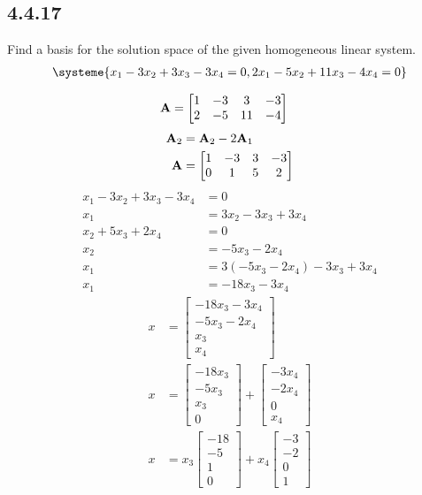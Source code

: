 \documentclass{article}
\begin{document}
\subsection{4.4.17}

Find a basis for the solution space of the given homogeneous linear system.
\begin{align*}
	\systeme{
		x_1 - 3x_2 + 3x_3 - 3x_4 = 0,
		2x_1 - 5x_2 + 11x_3 - 4x_4 = 0
	}
\end{align*}

\begin{align*}
	\mathbf{A} & =
		\begin{bmatrix}
			1 & -3 & 3 & -3 \\
			2 & -5 & 11 & -4
		\end{bmatrix}
\end{align*}
\begin{align*}
	\mathbf{A}_2 & = \mathbf{A}_2 - 2\mathbf{A}_1 \\
	\mathbf{A} & =
		\begin{bmatrix}
			1 & -3 & 3 & -3 \\
			0 & 1 & 5 & 2
		\end{bmatrix}
\end{align*}
\begin{align*}
	x_1 - 3x_2 + 3x_3 - 3x_4 & = 0 \\
	x_1 & = 3x_2 - 3x_3 + 3x_4 \\
	x_2 + 5x_3 + 2x_4 & = 0 \\
	x_2 & = -5x_3 - 2x_4 \\
	x_1 & = 3(-5x_3 - 2x_4) - 3x_3 + 3x_4 \\
	x_1 & = -18x_3 - 3x_4
\end{align*}
\begin{align*}
	x & =
		\begin{bmatrix}
			-18x_3 - 3x_4 \\
			-5x_3 - 2x_4 \\
			x_3 \\
			x_4
		\end{bmatrix} \\
	x & =
		\begin{bmatrix}
			-18x_3 \\ -5x_3 \\ x_3 \\ 0
		\end{bmatrix}
		+ \begin{bmatrix}
			-3x_4 \\ -2x_4 \\ 0 \\ x_4
		\end{bmatrix} \\
	x & =
		x_3 \begin{bmatrix}
			-18 \\ -5 \\ 1 \\ 0
		\end{bmatrix}
		+ x_4 \begin{bmatrix}
			-3 \\ -2 \\ 0 \\ 1
		\end{bmatrix}
\end{align*}
\end{document}
